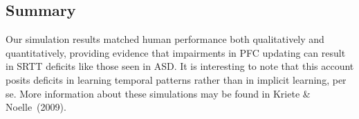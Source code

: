 \subsection{Summary}

Our simulation results matched human performance both qualitatively and quantitatively, providing evidence that impairments in PFC updating can result in SRTT deficits like those seen in ASD. It is interesting to note that this account posits deficits in learning temporal patterns rather than in implicit learning, per se. More information about these simulations may be found in Kriete \& Noelle~(2009).\nocite{KrieteT:2009:SRTT}

